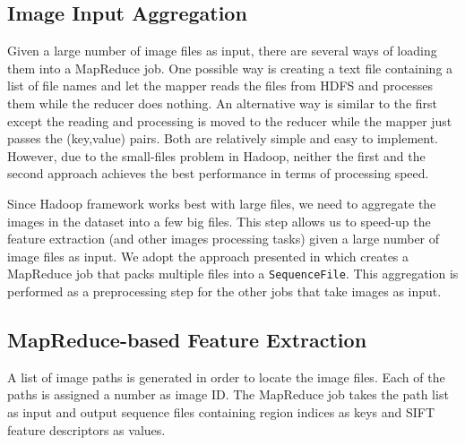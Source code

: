 \documentclass{sig-alternate}
\begin{document}
\subsection{Image Input Aggregation}
Given a large number of image files as input, there are several ways of loading them into a MapReduce job. One possible way is creating a text file containing a list of file names and let the mapper reads the files from HDFS and processes them while the reducer does nothing. An alternative way is similar to the first except the reading and processing is moved to the reducer while the mapper just passes the (key,value) pairs. Both are relatively simple and easy to implement. However, due to the small-files problem in Hadoop\cite{smallfiles}, neither the first and the second approach achieves the best performance in terms of processing speed. 

Since Hadoop framework works best with large files, we need to aggregate the images in the dataset into a few big files. This step allows us to speed-up the feature extraction (and other images processing tasks) given a large number of image files as input. We adopt the approach presented in\cite{combinefiles} which creates a MapReduce job that packs multiple files into a \texttt{SequenceFile}. This aggregation is performed as a preprocessing step for the other jobs that take images as input.

\subsection{MapReduce-based Feature Extraction}
A list of image paths is generated in order to locate the image files. Each of the paths is assigned a number as image ID. The MapReduce job takes the path list as input and output sequence files containing region indices as keys and SIFT feature descriptors as values.

\end{document}
